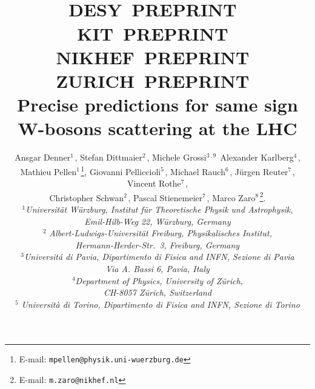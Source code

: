 \documentclass[11pt,epsf]{article}
\begin{document}
\title{\hfill ~\\[-30mm]
\phantom{h} \hfill\mbox{\small DESY PREPRINT } \\
\vspace{-10mm}
\phantom{h} \hfill\mbox{\small KIT PREPRINT } \\
\vspace{-10mm}
\phantom{h} \hfill\mbox{\small NIKHEF PREPRINT } \\
\vspace{-10mm}
\phantom{h} \hfill\mbox{\small ZURICH PREPRINT }
\\[1cm]
\textbf{Precise predictions for same sign W-bosons scattering at the LHC}}

\date{}
\author{
Ansgar Denner$^{1\,}$,
Stefan Dittmaier$^{2\,}$,
Michele Grossi$^{{3\,},{9\,}}$
Alexander Karlberg$^{4\,}$, \\
Mathieu Pellen$^{1\,}$\footnote{E-mail:
  \texttt{mpellen@physik.uni-wuerzburg.de}},
Giovanni  Pelliccioli$^{5\,}$,
Michael Rauch$^{6\,}$,
J\"urgen Reuter$^{7\,}$,
Vincent Rothe$^{7\,}$, \\
Christopher Schwan$^{2\,}$,
Pascal Stienemeier$^{7\,}$,
Marco Zaro$^{8\,}$\footnote{E-mail:
  \texttt{m.zaro@nikhef.nl}}.
\\[9mm]
{\small\it
$^1$Universit\"at W\"urzburg, %
        Institut f\"ur Theoretische Physik und Astrophysik,} \\ %
{\small\it Emil-Hilb-Weg 22,  W\"urzburg, %
        Germany}\\[3mm]
$^2${\small\it
Albert-Ludwigs-Universit\"at Freiburg, Physikalisches Institut,} \\ %
{\small\it Hermann-Herder-Str.\ 3,  Freiburg, Germany}\\[3mm]
{\small\it
$^3$Universit\'a di Pavia, Dipartimento di Fisica and INFN, Sezione di Pavia } \\ %
{\small\it Via A. Bassi 6,  Pavia, %
        Italy}\\[3mm]
{\small\it
$^4$Department of Physics, University of Z\"urich,} \\ %
{\small\it CH-8057
Z\"urich, Switzerland}\\[3mm]
$^5${\small\it
Universit\`a di Torino, Dipartimento di Fisica and INFN, Sezione di Torino } \\ %
}
\end{document}
